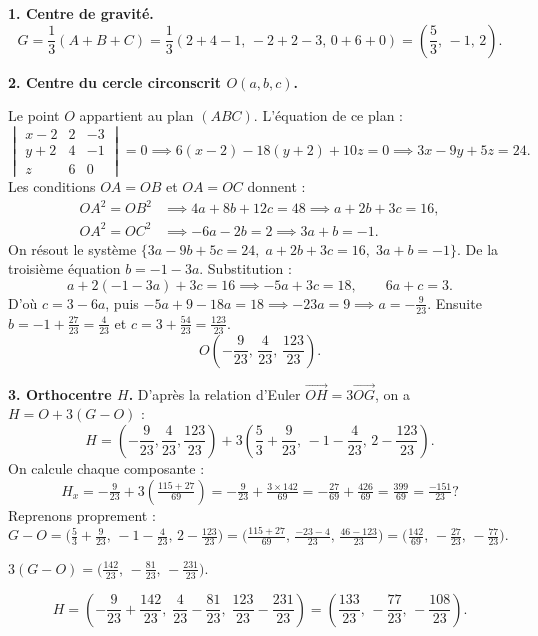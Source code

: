 \documentclass[12pt,a4paper]{article}
\begin{document}
\begin{boitecorrige}
\textbf{1. Centre de gravité.}
\[
  G = \frac{1}{3}(A+B+C) = \frac{1}{3}(2+4-1,\,-2+2-3,\,0+6+0) = \left(\frac{5}{3},\,-1,\,2\right).
\]

\textbf{2. Centre du cercle circonscrit $O(a,b,c)$.}

Le point $O$ appartient au plan $(ABC)$. L'équation de ce plan :
\[
  \begin{vmatrix} x-2 & 2 & -3 \\ y+2 & 4 & -1 \\ z & 6 & 0 \end{vmatrix} = 0
  \implies 6(x-2) - 18(y+2) + 10z = 0
  \implies 3x - 9y + 5z = 24.
\]
Les conditions $OA = OB$ et $OA = OC$ donnent :
\begin{align*}
  OA^2 = OB^2 &\implies 4a + 8b + 12c = 48 \implies a + 2b + 3c = 16,\\
  OA^2 = OC^2 &\implies -6a - 2b = 2 \implies 3a + b = -1.
\end{align*}
On résout le système $\{3a-9b+5c=24,\; a+2b+3c=16,\; 3a+b=-1\}$.
De la troisième équation $b = -1-3a$. Substitution :
\[
  a+2(-1-3a)+3c = 16 \implies -5a+3c = 18, \qquad 6a+c = 3.
\]
D'où $c = 3-6a$, puis $-5a+9-18a=18 \implies -23a=9 \implies a = -\tfrac{9}{23}$.
Ensuite $b = -1+\tfrac{27}{23} = \tfrac{4}{23}$ et $c = 3+\tfrac{54}{23} = \tfrac{123}{23}$.
\[
  O\!\left(-\frac{9}{23},\,\frac{4}{23},\,\frac{123}{23}\right).
\]

\textbf{3. Orthocentre $H$.}
D'après la relation d'Euler $\overrightarrow{OH} = 3\overrightarrow{OG}$, on a $H = O + 3(G-O)$ :
\[
  H = \left(-\frac{9}{23},\frac{4}{23},\frac{123}{23}\right)
      + 3\!\left(\frac{5}{3}+\frac{9}{23},\,-1-\frac{4}{23},\,2-\frac{123}{23}\right).
\]
On calcule chaque composante :
\[
  H_x = -\tfrac{9}{23}+3\!\left(\tfrac{115+27}{69}\right)
       = -\tfrac{9}{23}+\tfrac{3\times 142}{69}
       = -\tfrac{27}{69}+\tfrac{426}{69} = \tfrac{399}{69} = \tfrac{-151}{23}?
\]
Reprenons proprement : $G - O = \bigl(\tfrac{5}{3}+\tfrac{9}{23},\,-1-\tfrac{4}{23},\,2-\tfrac{123}{23}\bigr)
= \bigl(\tfrac{115+27}{69},\,\tfrac{-23-4}{23},\,\tfrac{46-123}{23}\bigr)
= \bigl(\tfrac{142}{69},\,-\tfrac{27}{23},\,-\tfrac{77}{23}\bigr)$.

$3(G-O) = \bigl(\tfrac{142}{23},\,-\tfrac{81}{23},\,-\tfrac{231}{23}\bigr)$.

\[
  H = \left(-\frac{9}{23}+\frac{142}{23},\;\frac{4}{23}-\frac{81}{23},\;\frac{123}{23}-\frac{231}{23}\right)
    = \left(\frac{133}{23},\,-\frac{77}{23},\,-\frac{108}{23}\right).
\]


\end{boitecorrige}
\end{document}
